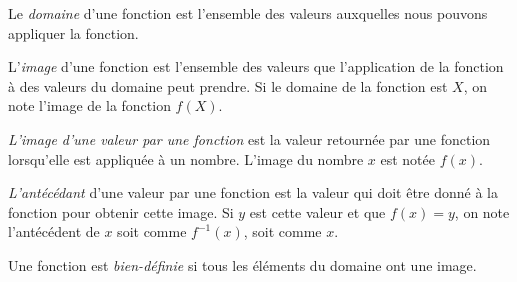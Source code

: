 \begin{definition}
    Le \emph{domaine} d'une fonction est l'ensemble des valeurs auxquelles nous pouvons appliquer la fonction.
\end{definition}

\begin{definition}
    L'\emph{image} d'une fonction est l'ensemble des valeurs que l'application de la fonction à des valeurs du domaine peut prendre. Si le domaine de la fonction est $X$, on note l'image de la fonction $f(X)$.
\end{definition}

\begin{definition}
    \emph{L'image d'une valeur par une fonction} est la valeur retournée par une fonction lorsqu'elle est appliquée à un nombre. L'image du nombre $x$ est notée $f(x)$.
\end{definition}

\begin{definition}
    \emph{L'antécédant} d'une valeur par une fonction est la valeur qui doit être donné à la fonction pour obtenir cette image. Si $y$ est cette valeur et que $f(x)=y$, on note l'antécédent de $x$ soit comme $f^{-1}(x)$, soit comme $x$.
\end{definition}

\begin{definition}
    Une fonction est \emph{bien-définie} si tous les éléments du domaine ont une image.
\end{definition}